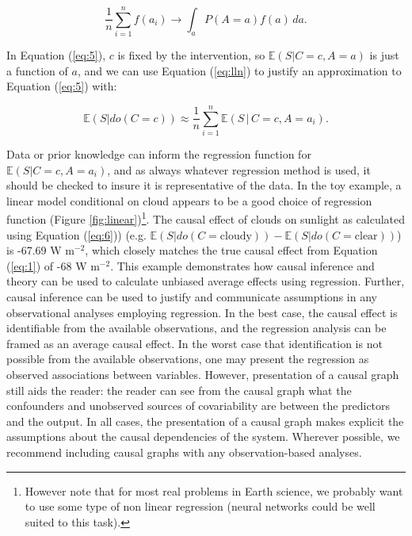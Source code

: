 \documentclass[12pt]{article}
\begin{document}
\begin{equation} \frac{1}{n} \sum_{i=1}^n f(a_i) \to \int_a P(A=a)
  f(a) \, d a.
  \label{eq:lln}
\end{equation}

In Equation (\ref{eq:5}), $c$ is fixed by the intervention, so
$\mathbb{E}(S| C=c, A=a)$ is just a function of $a$, and we can use
Equation (\ref{eq:lln}) to justify an approximation to Equation
(\ref{eq:5}) with:

\begin{equation} \mathbb{E}(S | do(C = c)) \approx \frac{1}{n}
  \sum_{i=1}^n \mathbb{E}(S \, | \, C=c, A=a_i).
  \label{eq:6}
\end{equation}

Data or prior knowledge can inform the regression function for
$\mathbb{E}(S | C=c, A=a_i)$, and as always whatever regression method
is used, it should be checked to insure it is representative of the
data. In the toy example, a linear model conditional on cloud appears
to be a good choice of regression function (Figure
\ref{fig:linear})\footnote{However note that for most real problems in
  Earth science, we probably want to use some type of non linear
  regression (neural networks could be well suited to this task).}. The
causal effect of clouds on sunlight as calculated using Equation
(\ref{eq:6})) (e.g.  $\mathbb{E}(S | do(C = \text{cloudy})) -
\mathbb{E}(S | do(C = \text{clear}))$) is -67.69 W m$^{-2}$, which
closely matches the true causal effect from Equation (\ref{eq:1}) of
-68 W m$^{-2}$. This example demonstrates how causal inference and
theory can be used to calculate unbiased average effects using
regression. Further, causal inference can be used to justify and
communicate assumptions in any observational analyses employing
regression. In the best case, the causal effect is identifiable from
the available observations, and the regression analysis can be framed
as an average causal effect. In the worst case that identification is
not possible from the available observations, one may present the
regression as observed associations between variables. However,
presentation of a causal graph still aids the reader: the reader can
see from the causal graph what the confounders and unobserved sources
of covariability are between the predictors and the output. In all
cases, the presentation of a causal graph makes explicit the
assumptions about the causal dependencies of the system. Wherever
possible, we recommend including causal graphs with any
observation-based analyses.
\end{document}
